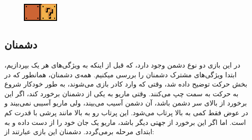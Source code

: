 \documentclass{utap}
\begin{document}
\begin{itemize}
\begin{itemize}
\begin{minipage}{.7\textwidth}
\end{minipage}
\begin{minipage}{.15\textwidth}
\begin{figure}[H]
	\begin{center}
		\includegraphics[width=1.8cm]{magicBricks}
	\end{center}
\end{figure}
\end{minipage}

		\end{itemize}
	\end{itemize}


	\subsection{دشمنان}
در این بازی دو نوع دشمن وجود دارد، که قبل از اینکه به ویژگی‌های هر یک بپردازیم، ابتدا ویژگی‌های مشترک دشمنان را بررسی میکنیم.
همه‌ی دشمنان، همانطور که در بخش حرکت توضیح داده شد، وقتی که وارد کادر بازی می‌شوند، به طور خودکار شروع به حرکت به سمت چپ می‌کنند.
وقتی ماریو به یکی از دشمنان برخورد کند، اگر این برخورد از بالای سر دشمن باشد، آن دشمن آسیب می‌بیند، ولی ماریو آسیبی نمی‌بیند و در عوض فقط کمی به بالا پرتاب می‌شود. این پرتاب رو به بالا مانند پرشی با قدرت کم است. اما اگر این برخورد از جهتی دیگر باشد، ماریو یک جان خود را از دست داده و به ابتدای مرحله برمی‌گردد. دشمنان این بازی عبارتند از:
\end{document}
